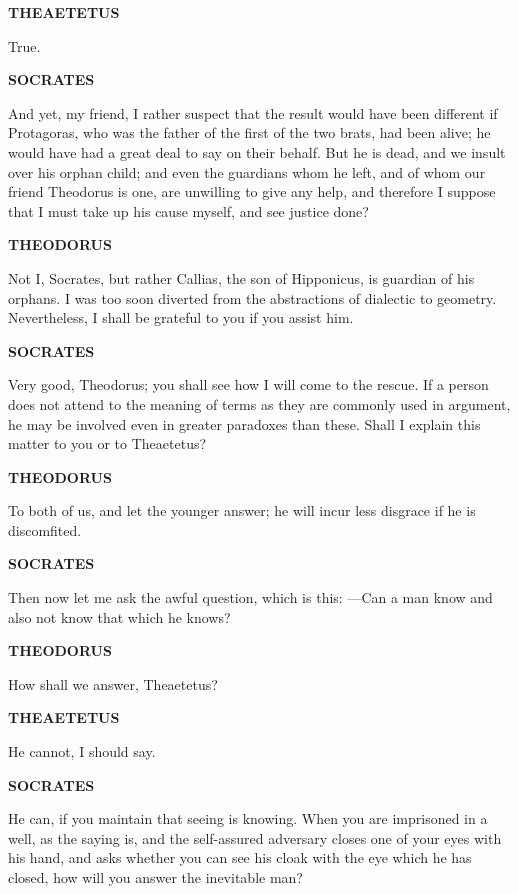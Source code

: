 \documentclass[11pt,letter]{article}
\begin{document}
\par \textbf{THEAETETUS}
\par   True.

\par \textbf{SOCRATES}
\par   And yet, my friend, I rather suspect that the result would have been different if Protagoras, who was the father of the first of the two brats, had been alive; he would have had a great deal to say on their behalf. But he is dead, and we insult over his orphan child; and even the guardians whom he left, and of whom our friend Theodorus is one, are unwilling to give any help, and therefore I suppose that I must take up his cause myself, and see justice done?

\par \textbf{THEODORUS}
\par   Not I, Socrates, but rather Callias, the son of Hipponicus, is guardian of his orphans. I was too soon diverted from the abstractions of dialectic to geometry. Nevertheless, I shall be grateful to you if you assist him.

\par \textbf{SOCRATES}
\par   Very good, Theodorus; you shall see how I will come to the rescue. If a person does not attend to the meaning of terms as they are commonly used in argument, he may be involved even in greater paradoxes than these. Shall I explain this matter to you or to Theaetetus?

\par \textbf{THEODORUS}
\par   To both of us, and let the younger answer; he will incur less disgrace if he is discomfited.

\par \textbf{SOCRATES}
\par   Then now let me ask the awful question, which is this: —Can a man know and also not know that which he knows?

\par \textbf{THEODORUS}
\par   How shall we answer, Theaetetus?

\par \textbf{THEAETETUS}
\par   He cannot, I should say.

\par \textbf{SOCRATES}
\par   He can, if you maintain that seeing is knowing. When you are imprisoned in a well, as the saying is, and the self-assured adversary closes one of your eyes with his hand, and asks whether you can see his cloak with the eye which he has closed, how will you answer the inevitable man?
\end{document}
